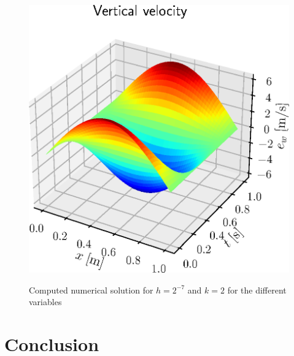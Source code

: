 \documentclass{ifacconf}
\begin{document}
\begin{figure}[ht]
{		\includegraphics[width=0.48\columnwidth]{plot_e_w_cropped.eps}}%
	\hspace{8pt}%
	 \\
	\caption{Computed numerical solution for $h=2^{-7}$ and $k=2$ for the different variables}%
	\label{fig:plot}%
\end{figure}

\section{Conclusion}
\end{document}
